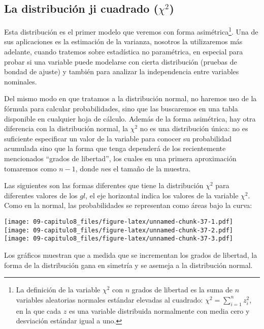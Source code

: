 \documentclass[]{article}
\let\rmarkdownfootnote\footnote%
\def\footnote{\protect\rmarkdownfootnote}
\begin{document}
\hypertarget{la-distribuciuxf3n-ji-cuadrado-chi2}{%
\subsection{\texorpdfstring{La distribución ji cuadrado
(\(\chi^{2}\))}{La distribución ji cuadrado (\textbackslash{}chi\^{}\{2\})}}\label{la-distribuciuxf3n-ji-cuadrado-chi2}}

Esta distribución es el primer modelo que veremos con forma
asimétrica\footnote{La definición de la variable \(\chi^{2}\) con \(n\)
  grados de libertad es la suma de \(n\) variables aleatorias normales
  estándar elevadas al cuadrado:
  \(\chi^{2} = \sum_{i = 1}^{n}z_{i}^{2}\), en la que cada \(z\) es una
  variable distribuida normalmente con media cero y desviación estándar
  igual a uno.}. Una de sus aplicaciones es la estimación de la
varianza, nosotros la utilizaremos más adelante, cuando tratemos sobre
estadística no paramétrica, en especial para probar si una variable
puede modelarse con cierta distribución (pruebas de bondad de ajuste) y
también para analizar la independencia entre variables nominales.

Del mismo modo en que tratamos a la distribución normal, no haremos uso
de la fórmula para calcular probabilidades, sino que las buscaremos en
una tabla disponible en cualquier hoja de cálculo. Además de la forma
asimétrica, hay otra diferencia con la distribución normal, la
\(\chi^{2}\) no es una distribución única: no es suficiente especificar
un valor de la variable para conocer su probabilidad acumulada sino que
la forma que tenga dependerá de los recientemente mencionados ``grados
de libertad'', los cuales en una primera aproximación tomaremos como
\(n-1\), donde \(n\)es el tamaño de la muestra.

Las siguientes son las formas diferentes que tiene la distribución
\(\chi^{2}\) para diferentes valores de los \(gl\), el eje horizontal
indica los valores de la variable \(\chi^{2}\). Como en la normal, las
probabilidades se representan como áreas bajo la curva:

\texttt{[image: 09-capitulo8\_files/figure-latex/unnamed-chunk-37-1.pdf]}
\texttt{[image: 09-capitulo8\_files/figure-latex/unnamed-chunk-37-2.pdf]}
\texttt{[image: 09-capitulo8\_files/figure-latex/unnamed-chunk-37-3.pdf]}

Los gráficos muestran que a medida que se incrementan los grados de
libertad, la forma de la distribución gana en simetría y se asemeja a la
distribución normal.
\end{document}
